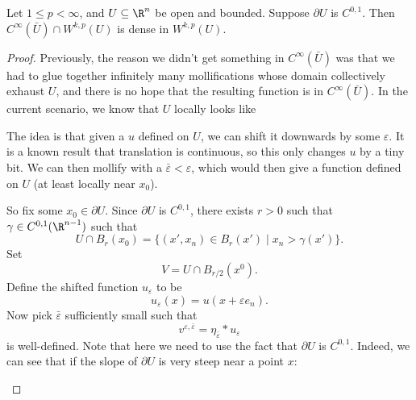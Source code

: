 \documentclass[a4paper]{article}
\begin{document}
\begin{thm}
  Let $1 \leq p < \infty$, and $U \subseteq \R^n$ be open and bounded. Suppose $\partial U$ is $C^{0, 1}$. Then $C^\infty(\bar{U}) \cap W^{k, p}(U)$ is dense in $W^{k, p}(U)$.
\end{thm}

\begin{proof}
  Previously, the reason we didn't get something in $C^\infty(\bar{U})$ was that we had to glue together infinitely many mollifications whose domain collectively exhaust $U$, and there is no hope that the resulting function is in $C^\infty(\bar{U})$. In the current scenario, we know that $U$ locally looks like
  \begin{center}
  \end{center}
  The idea is that given a $u$ defined on $U$, we can shift it downwards by some $\varepsilon$. It is a known result that translation is continuous, so this only changes $u$ by a tiny bit. We can then mollify with a $\bar{\varepsilon} < \varepsilon$, which would then give a function defined on $U$ (at least locally near $x_0$).

  So fix some $x_0 \in \partial U$. Since $\partial U$ is $C^{0, 1}$, there exists $r > 0$ such that $\gamma \in C^{0, 1}(\R^{n - 1})$ such that
  \[
    U \cap B_r(x_0) = \{(x', x_n) \in B_r(x') \mid x_n > \gamma(x')\}.
  \]
  Set
  \[
    V = U \cap B_{r/2}(x^0).
  \]
  Define the shifted function $u_\varepsilon$ to be
  \[
    u_\varepsilon(x) = u(x + \varepsilon e_n).
  \]
  Now pick $\bar{\varepsilon}$ sufficiently small such that
  \[
    v^{\varepsilon, \bar{\varepsilon}} = \eta_{\bar{\varepsilon}} * u_\varepsilon
  \]
  is well-defined. Note that here we need to use the fact that $\partial U$ is $C^{0, 1}$. Indeed, we can see that if the slope of $\partial U$ is very steep near a point $x$:
  \begin{center}
\end{center}
\end{proof}
\end{document}
